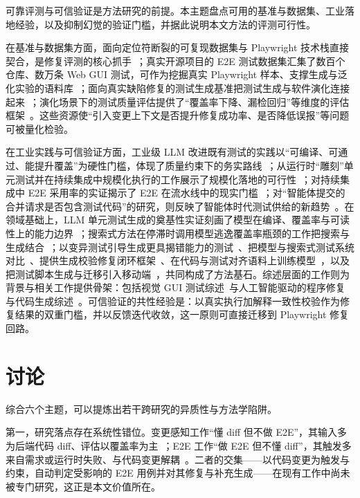 \documentclass[11pt,a4paper]{article}
\begin{document}
可靠评测与可信验证是方法研究的前提。本主题盘点可用的基准与数据集、工业落地经验，以及抑制幻觉的验证门槛，并据此说明本文方法的评测可行性。

在基准与数据集方面，面向定位符断裂的可复现数据集与 Playwright 技术栈直接契合，是修复评测的核心抓手~\cite{reprobreak}；真实开源项目的 E2E 测试数据集汇集了数百个仓库、数万条 Web GUI 测试，可作为挖掘真实 Playwright 样本、支撑生成与泛化实验的语料库~\cite{e2egit}；面向真实缺陷修复的测试生成基准把测试生成与软件演化连接起来~\cite{swtbench}；演化场景下的测试质量评估提供了“覆盖率下降、漏检回归”等维度的评估框架~\cite{evalevolution}。这些资源使“引入变更上下文是否提升修复成功率、是否降低误报”等问题可被量化检验。

在工业实践与可信验证方面，工业级 LLM 改进既有测试的实践以“可编译、可通过、能提升覆盖”为硬性门槛，体现了质量约束下的务实路线~\cite{testgenllm}；从运行时“雕刻”单元测试并在持续集成中规模化执行的工作展示了规模化落地的可行性~\cite{testgenmeta}；对持续集成中 E2E 采用率的实证揭示了 E2E 在流水线中的现实门槛~\cite{androidci}；对“智能体提交的合并请求是否包含测试代码”的研究，则反映了智能体时代测试供给的新趋势~\cite{agenticpr}。在领域基础上，LLM 单元测试生成的奠基性实证刻画了模型在编译、覆盖率与可读性上的能力边界~\cite{empiricalllmunit}；搜索式方法在停滞时调用模型逃逸覆盖率瓶颈的工作把搜索与生成结合~\cite{codamosa}；以变异测试引导生成更具揭错能力的测试~\cite{mutationtestgen}、把模型与搜索式测试系统对比~\cite{chatgptvssbst}、提供生成校验修复闭环框架~\cite{chatunitest}、在代码与测试对齐语料上训练模型~\cite{catlm}，以及把测试脚本生成与迁移引入移动端~\cite{testscriptmigration}，共同构成了方法基石。综述层面的工作则为背景与相关工作提供骨架：包括视觉 GUI 测试综述~\cite{visionguisurvey}与人工智能驱动的程序修复与代码生成综述~\cite{aprcodegensurvey}。可信验证的共性经验是：以真实执行加解释一致性校验作为修复结果的双重门槛，并以反馈迭代收敛，这一原则可直接迁移到 Playwright 修复回路。

\section{讨论}

综合六个主题，可以提炼出若干跨研究的异质性与方法学陷阱。

第一，研究落点存在系统性错位。变更感知工作“懂 diff 但不做 E2E”，其输入多为后端代码 diff、评估以覆盖率为主~\cite{symprompt,chaco,canllmcommit}；E2E 工作“做 E2E 但不懂 diff”，其触发多来自需求或运行时失败、与代码变更解耦~\cite{autoe2e,screentransition,practicallimits}。二者的交集——以代码变更为触发与约束，自动判定受影响的 E2E 用例并对其修复与补充生成——在现有工作中尚未被专门研究，这正是本文价值所在。
\end{document}
